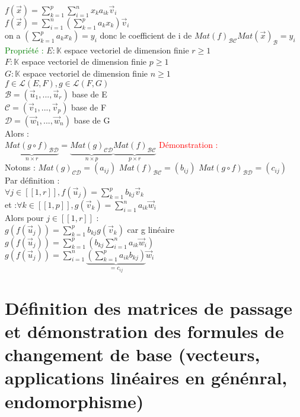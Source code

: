 \documentclass{article}
\begin{document}
        $f(\vec x)= \sum_{k=1}^p \sum_{i=1}^n x_k a_{ik} \vec v_i$ \\
        $f(\vec x)= \sum_{i=1}^n (\sum_{k=1}^p a_k x_k) \vec v_i$ \\
        on a $(\sum_{k=1}^p a_k x_k)=y_i$ donc le coefficient de i de $Mat(f)_{\mathcal{BC}} Mat(\vec x)_{\mathcal B}=y_i$ \\
        \textcolor{green}{Propriété :} $E: \mathbb K$ espace vectoriel de dimension finie $r \geq 1$ \\
        $F: \mathbb K$ espace vectoriel de dimension finie $p \geq 1$ \\
        $G: \mathbb K$ espace vectoriel de dimension finie $n \geq 1$ \\
        $f \in \mathcal L(E,F), g \in \mathcal L(F,G)$ \\
        $\mathcal B =( \vec u_1,..., \vec u_r) $ base de E \\
        $\mathcal C =( \vec v_1,..., \vec v_p) $ base de F \\
        $\mathcal D =( \vec w_1,..., \vec w_n) $ base de G \\
        Alors : \\
        $\underbrace{Mat(g \circ f)_{\mathcal{BD}}}_{n \times r}=\underbrace{Mat(g)_{\mathcal{CD}}}_{n \times p} \underbrace{Mat(f)_{\mathcal{BC}}}_{p \times r}$
        \textcolor{red}{Démonstration :} \\
        Notons : $Mat(g)_{\mathcal{CD}}=(a_{ij})$ 
        $Mat(f)_{\mathcal{BC}}=(b_{ij})$ 
        $Mat(g \circ f)_{\mathcal{BD}}=(c_{ij})$  \\
        Par définition : \\
        $\forall j \in [[1,r]], f(\vec u_j)=\sum_{k=1}^p b_{kj} \vec v_k$\\
        et :$\forall k \in [[1,p]], g(\vec v_k)=\sum_{i=1}^n a_{ik} \vec w_i$ \\
        Alors pour $j \in [[ 1,r ]] $ : \\
        $g(f(\vec u_j))= \sum_{k=1}^p b_{kj} g(\vec v_k)$ car g linéaire \\
        $g(f(\vec u_j))=\sum_{k=1}^p(b_{kj}\sum_{i=1}^n a_{ik} \vec w_i)$ \\
        $g(f(\vec u_j))=\sum_{i=1}^n\underbrace{(\sum_{k=1}^p a_{ik} b_{kj})}_{=c_{ij}} \vec w_i$ \\ 
        \section{Définition des matrices de passage et démonstration des formules de changement de base (vecteurs, applications linéaires en génénral, endomorphisme)}
\end{document}
